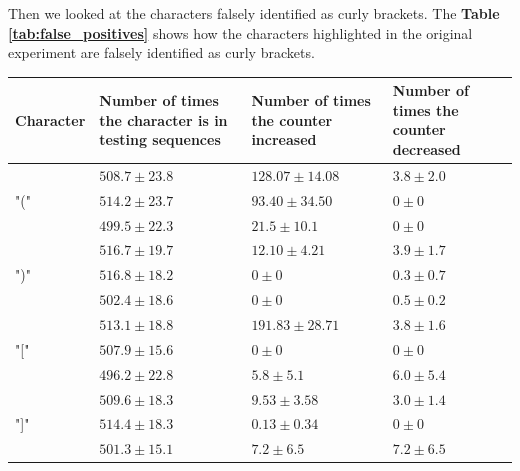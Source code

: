 Then we looked at the characters falsely identified as curly brackets. The \textbf{Table \ref{tab:false_positives}} shows how the characters highlighted in the original experiment are falsely identified as curly brackets.

\begin{table}[!ht]
    \centering
    \begin{tabular}{|C{15mm}|C{32mm}|C{32mm}|C{32mm}|}
        \hline
        Character & Number of times the character is in testing sequences & Number of times the counter increased & Number of times the counter decreased \\ \hline \hline
        
         & \textcolor{mygreen}{$508.7 \pm 23.8$} & \textcolor{mygreen}{$128.07 \pm 14.08$} & \textcolor{mygreen}{$3.8 \pm 2.0$} \\
        & \textcolor{mygreen2}{$514.2 \pm 23.7$} & \textcolor{mygreen2}{$93.40 \pm 34.50$} & \textcolor{mygreen2}{$0 \pm 0$} \\
        & $499.5 \pm 22.3$ & $21.5 \pm 10.1$ & $0 \pm 0$ \\ \hline
        
         & \textcolor{mygreen}{$516.7 \pm 19.7$} & \textcolor{mygreen}{$12.10 \pm 4.21$} & \textcolor{mygreen}{$3.9 \pm 1.7$} \\
        & \textcolor{mygreen2}{$516.8 \pm 18.2$} & \textcolor{mygreen2}{$0 \pm 0$} & \textcolor{mygreen2}{$0.3 \pm 0.7$}\\
        & $502.4 \pm 18.6$ & $0 \pm 0$ &  $0.5 \pm 0.2$ \\ \hline
        
        \multirow{3}{*}{"["} & \textcolor{mygreen}{$513.1 \pm 18.8$} & \textcolor{mygreen}{$191.83 \pm 28.71$} & \textcolor{mygreen}{$3.8 \pm 1.6$} \\
        & \textcolor{mygreen2}{$507.9 \pm 15.6$} & \textcolor{mygreen2}{$0 \pm 0$} & \textcolor{mygreen2}{$0 \pm 0$}\\
        & $496.2 \pm 22.8$ & $5.8 \pm 5.1$ & $6.0 \pm 5.4$ \\ \hline
        
        \multirow{3}{*}{"]"} & \textcolor{mygreen}{$509.6 \pm 18.3$} & \textcolor{mygreen}{$9.53 \pm 3.58$} & \textcolor{mygreen}{$3.0 \pm 1.4$}\\
        & \textcolor{mygreen2}{$514.4 \pm 18.3$} & \textcolor{mygreen2}{$0.13 \pm 0.34$} & \textcolor{mygreen2}{$0 \pm 0$}\\
        & $501.3 \pm 15.1$ & $7.2 \pm 6.5$ & $7.2 \pm 6.5$ \\ \hline
        

\end{tabular}
\end{table}

